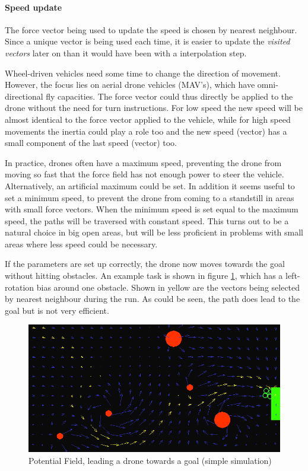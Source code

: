 \documentclass[11pt]{article}
\begin{document}
\paragraph{Speed update}
The force vector being used to update the speed is chosen by nearest neighbour. Since a unique vector is being used each time, it is easier to update the \emph{visited vectors} later on than it would have been with a interpolation step.

Wheel-driven vehicles need some time to change the direction of movement. However, the focus lies on aerial drone vehicles (MAV's), which have omni-directional fly capacities. The force vector could thus directly be applied to the drone without the need for turn instructions. For low speed the new speed will be almost identical to the force vector applied to the vehicle, while for high speed movements the inertia could play a role too and the new speed (vector) has a small component of the last speed (vector) too.

In practice, drones often have a maximum speed, preventing the drone from moving so fast that the force field has not enough power to steer the vehicle. Alternatively, an artificial maximum could be set. In addition it seems useful to set a minimum speed, to prevent the drone from coming to a standstill in areas with small force vectors. When the minimum speed is set equal to the maximum speed, the paths will be traversed with constant speed. This turns out to be a natural choice in big open areas, but will be less proficient in problems with small areas where less speed could be necessary.

If the parameters are set up correctly, the drone now moves towards the goal without hitting obstacles. An example task is shown in figure \ref{fig:goal_directed}, which has a left-rotation bias around one obstacle. Shown in yellow are the vectors being selected by nearest neighbour during the run. As could be seen, the path does lead to the goal but is not very efficient.

  \begin{figure}
    \includegraphics[width=1.0\textwidth]{img/goal_directed}
    \caption{Potential Field, leading a drone towards a goal (simple simulation)}
    \label{fig:goal_directed}
  \end{figure}
\end{document}
